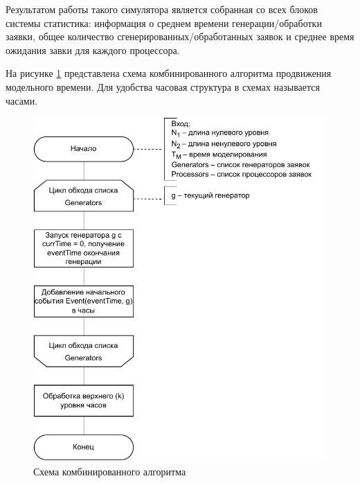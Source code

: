 Результатом работы такого симулятора является собранная со всех блоков системы статистика:
информация о среднем времени генерации/обработки заявки, общее количество сгенерированных/обработанных заявок и среднее время ожидания завки для каждого процессора.

\clearpage
На рисунке \ref{img:hybrid_simulate_schema} представлена схема комбинированного алгоритма продвижения модельного времени. Для удобства часовая структура в схемах называется часами.
\begin{figure}[h!btp]
	\centering
	\includegraphics[width=1\columnwidth]{inc/img/hybrid_simulate_schema.pdf}
	\caption{Схема комбинированного алгоритма}
	\label{img:hybrid_simulate_schema}	
\end{figure}

